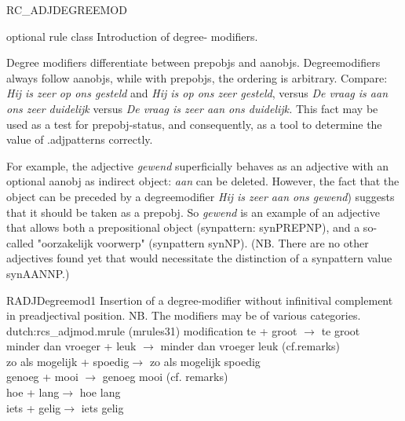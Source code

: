 \newpage
\begin{mruleclass}{RC\_ADJDEGREEMOD}
\begin{classdescr}
\kind optional rule class
\classtask Introduction of degree-
modifiers. 

\classremarks
Degree modifiers differentiate between prepobjs and aanobjs. Degreemodifiers 
always 
follow aanobjs, while with prepobjs, the ordering is arbitrary.
Compare: {\em Hij is zeer op ons gesteld} and {\em Hij is op ons zeer gesteld}, 
versus {\em De vraag is aan ons zeer duidelijk} versus {\em *De vraag is zeer 
aan ons duidelijk.}
This fact may be used as a test for prepobj-status, and consequently, as a tool
to determine the value of .adjpatterns correctly.

For example, the adjective {\em gewend} superficially  
behaves as an adjective with an 
optional aanobj as indirect object: {\em aan} can be deleted. However, the fact 
that the object can be preceded by a degreemodifier 
{\em Hij is zeer aan ons gewend}) suggests that it should 
be taken as a prepobj.  
So {\em gewend} is an example of an adjective that allows both
a prepositional object (synpattern: synPREPNP), and
a so-called "oorzakelijk voorwerp" (synpattern synNP).
(NB. There are no other adjectives found yet that would necessitate 
the distinction of a synpattern value synAANNP.)
\nofilters

\nospeedrules

\noplannedrules

\norulesnotince

\begin{comments}
\end{comments}
\end{classdescr}

\begin{members}
\begin{member}
 RADJDegreemod1
 Insertion of a degree-modifier without infinitival complement
in preadjectival position.
NB. The modifiers may be of various categories.
\file dutch:rcs\_adjmod.mrule (mrules31)
\semantics modification
\example te + groot $\rightarrow$ te groot\\
minder dan  vroeger + leuk $\rightarrow$ minder dan vroeger leuk (cf.remarks)\\
zo als mogelijk + spoedig$\rightarrow$ zo als mogelijk spoedig\\
genoeg + mooi $\rightarrow$ genoeg mooi (cf. remarks)\\
hoe + lang$\rightarrow$ hoe lang \\
iets + gelig$\rightarrow$ iets gelig\\


\end{member}
\end{members}
\end{mruleclass}
